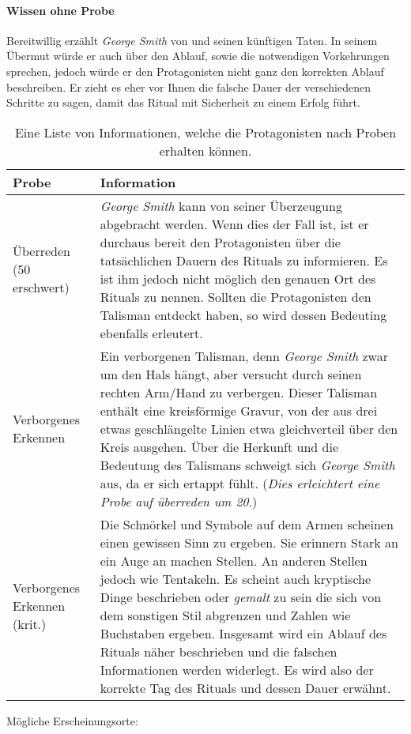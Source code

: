         \paragraph{Wissen ohne Probe}
            Bereitwillig erzählt \emph{George Smith} von  und seinen künftigen Taten. In seinem Übermut würde er auch über den Ablauf, sowie die notwendigen Vorkehrungen sprechen, jedoch würde er den Protagonisten nicht ganz den korrekten Ablauf beschreiben. Er zieht es eher vor Ihnen die falsche Dauer der verschiedenen Schritte zu sagen, damit das Ritual mit Sicherheit zu einem Erfolg führt.

            \begin{table}[H]
                \begin{tabularx}{\textwidth}{|l|X|}
                    \hline
                    Probe & Information \\ \hline
                    Überreden (50 erschwert) & \emph{George Smith} kann von seiner Überzeugung abgebracht werden. Wenn dies der Fall ist, ist er durchaus bereit den Protagonisten über die tatsächlichen Dauern des Rituals zu informieren. Es ist ihm jedoch nicht möglich den genauen Ort des Rituals zu nennen. 
                    Sollten die Protagonisten den Talisman entdeckt haben, so wird dessen Bedeuting ebenfalls erleutert.\\ \hline
                    Verborgenes Erkennen & Ein verborgenen Talisman, denn \emph{George Smith} zwar um den Hals hängt, aber versucht durch seinen rechten Arm/Hand zu verbergen. Dieser Talisman enthält eine kreisförmige Gravur, von der aus drei etwas geschlängelte Linien etwa gleichverteil über den Kreis ausgehen. Über die Herkunft und die Bedeutung des Talismans schweigt sich \emph{George Smith} aus, da er sich ertappt fühlt. (\emph{Dies erleichtert eine Probe auf überreden um 20}.)\\ \hline
                    Verborgenes Erkennen (krit.) & Die Schnörkel und Symbole auf dem Armen scheinen einen gewissen Sinn zu ergeben. Sie erinnern Stark an ein Auge an machen Stellen. An anderen Stellen jedoch wie Tentakeln. Es scheint auch kryptische Dinge beschrieben oder \emph{gemalt} zu sein die sich von dem sonstigen Stil abgrenzen und Zahlen wie Buchstaben ergeben. Insgesamt wird ein Ablauf des Rituals näher beschrieben und die falschen Informationen werden widerlegt. Es wird also der korrekte Tag des Rituals und dessen Dauer erwähnt. \\ \hline
                \end{tabularx}
                \caption{Eine Liste von Informationen, welche die Protagonisten nach Proben erhalten können.}
            \end{table}
    

    Mögliche Erscheinungsorte: 
    

